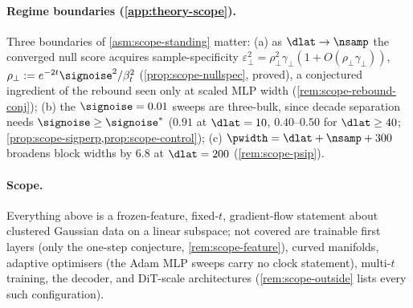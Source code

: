 \paragraph{Regime boundaries (\cref{app:theory-scope}).}
Three boundaries of \cref{asm:scope-standing} matter: (a) as $\dlat\to\nsamp$ the converged null score acquires sample-specificity $\varepsilon_\perp^2=\rho_\perp^2\gamma_\perp(1+O(\rho_\perp\gamma_\perp))$, $\rho_\perp:=e^{-2t}\signoise^2/\beta_t^2$ (\cref{prop:scope-nullspec}, proved), a conjectured ingredient of the rebound seen only at scaled MLP width (\cref{rem:scope-rebound-conj}); (b) the $\signoise=0.01$ sweeps are three-bulk, since decade separation needs $\signoise\ge\signoise^*$ ($0.91$ at $\dlat=10$, $0.40$--$0.50$ for $\dlat\ge40$; \cref{prop:scope-sigperp,prop:scope-control}); (c) $\pwidth=\dlat+\nsamp+300$ broadens block widths by $6.8$ at $\dlat=200$ (\cref{rem:scope-psip}).

\paragraph{Scope.}
Everything above is a frozen-feature, fixed-$t$, gradient-flow statement about clustered Gaussian data on a linear subspace; not covered are trainable first layers (only the one-step conjecture, \cref{rem:scope-feature}), curved manifolds, adaptive optimisers (the Adam MLP sweeps carry no clock statement), multi-$t$ training, the decoder, and DiT-scale architectures (\cref{rem:scope-outside} lists every such configuration).
